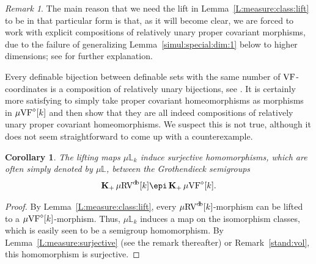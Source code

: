 \documentclass[12pt]{amsart}
\theoremstyle{plain}
\newtheorem{cor}[thm]{Corollary}
\theoremstyle{definition}
\theoremstyle{remark}
\newtheorem{rem}[thm]{Remark}
\numberwithin{equation}{section}
\theoremstyle{plain}
\newcommand{\VF}{\textup{VF}}
\newcommand{\RV}{\textup{RV}}
\newcommand{\0}{\emptyset}
\newcommand{\bb}[1]{\mathbb{#1}}
\newcommand{\mVF}{{\mu}{\VF}}
\newcommand{\mRV}{{\mu}{\RV}}
\DeclareMathOperator{\gsk}{\mathbf{K}_+}
\DeclareMathOperator{\db}{d \! b}
\begin{document}
\begin{rem}
The main reason that we need the lift in Lemma~\ref{L:measure:class:lift} to be in that particular form is that, as it will become clear, we are forced to work with explicit compositions of relatively unary proper covariant morphisms, due to the failure of generalizing Lemma~\ref{simul:special:dim:1} below to higher dimensions; see \cite[\S~1]{Yin:int:acvf} for further explanation.

Every definable bijection between definable sets with the same number of $\VF$-coordinates is a composition of relatively unary bijections, see \cite[Lemma~5.6]{Yin:int:acvf}.   It is certainly more satisfying to simply take proper covariant homeomorphisms as morphisms in $\mVF^{\diamond}[k]$ and then show that they are all indeed compositions of relatively unary proper covariant homeomorphisms. We suspect this is not true, although it does not seem straightforward to come up with a counterexample.
\end{rem}




\begin{cor}\label{L:sur:c}
The lifting maps ${\mu}\bb L_{k}$ induce surjective homomorphisms, which are often simply denoted by ${\mu}\bb L$, between the Grothendieck semigroups
\[
 \gsk \mRV^{\db}[k] \epi \gsk \mVF^{\diamond}[k].
\]
\end{cor}
\begin{proof}
By Lemma~\ref{L:measure:class:lift}, every $\mRV^{\db}[k]$-morphism can be lifted to a $\mVF^{\diamond}[k]$-morphism. Thus, ${\mu}\bb L_{k}$ induces a map on the isomorphism classes, which is easily seen to be a semigroup homomorphism. By Lemma~\ref{L:measure:surjective} (see the remark thereafter) or Remark~\ref{stand:vol}, this  homomorphism is surjective.
\end{proof}
\end{document}
